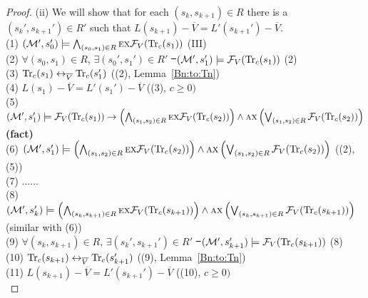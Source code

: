 \documentclass{article}
\begin{document}
\begin{proof}
        (ii) We will show that for each $(s_k, s_{k+1}) \in R$ there is a $(s_k', s_{k+1}') \in R'$ such that $L(s_{k+1}) - \overline V = L'(s_{k+1}') - \overline V$.\\
        (1) $({\cal M}', s_0') \models \bigwedge_{(s_0, s_1) \in R} \textsc{e} \textsc{x} {\cal F}_V(\textrm{Tr}_c(s_1))$  \hfill  (III)\\
        (2) $\forall (s_0, s_1) \in R$, $\exists (s_0', s_1') \in R'$ \st\ $({\cal M}', s_1') \models {\cal F}_V(\textrm{Tr}_c(s_1))$  \hfill  (2)\\
        (3) $\textrm{Tr}_c(s_1) \leftrightarrow_{\overline V} \textrm{Tr}_c(s_1')$  \hfill  ((2), Lemma~\ref{Bn:to:Tn}) \\
        (4) $L(s_1) - \overline V = L'(s_1') - \overline V$  \hfill   ((3), $c \geq 0)$\\
        (5) $({\cal M}', s_1') \models {\cal F}_V(\textrm{Tr}_c(s_1)) \rightarrow \left(\bigwedge_{(s_1,s_2)\in R} \textsc{e} \textsc{x} {\cal F}_V(\textrm{Tr}_c(s_2))\right) \wedge \textsc{a} \textsc{x} \left(\bigvee_{(s_1,s_2)\in R} {\cal F}_V(\textrm{Tr}_c(s_2))\right)$     \hfill  \textbf{(fact)}\\
        (6) $({\cal M}', s_1') \models \left(\bigwedge_{(s_1,s_2)\in R} \textsc{e} \textsc{x} {\cal F}_V(\textrm{Tr}_c(s_2))\right) \wedge \textsc{a} \textsc{x} \left(\bigvee_{(s_1,s_2)\in R} {\cal F}_V(\textrm{Tr}_c(s_2))\right)$ \hfill ((2), (5))\\
        (7) $\dots \dots$ \\
        (8) $({\cal M}', s_k') \models \left(\bigwedge_{(s_k,s_{k+1})\in R} \textsc{e} \textsc{x} {\cal F}_V(\textrm{Tr}_c(s_{k+1}))\right) \wedge \textsc{a} \textsc{x} \left(\bigvee_{(s_k,s_{k+1})\in R} {\cal F}_V(\textrm{Tr}_c(s_{k+1}))\right)$       \hfill (similar with (6))\\
        (9) $\forall (s_k, s_{k+1}) \in R$, $\exists (s_k', s_{k+1}') \in R'$ \st\ $({\cal M}', s_{k+1}') \models {\cal F}_V(\textrm{Tr}_c(s_{k+1}))$  \hfill  (8)\\
        (10) $\textrm{Tr}_c(s_{k+1}) \leftrightarrow_{\overline V} \textrm{Tr}_c(s_{k+1}')$    \hfill ((9), Lemma~\ref{Bn:to:Tn}) \\
        (11) $L(s_{k+1}) - \overline V = L'(s_{k+1}') - \overline V$  \hfill   ((10), $c \geq 0)$\\



\end{proof}
\end{document}
